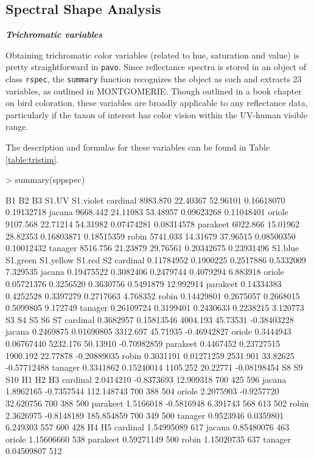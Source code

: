 \documentclass{article}
\newcommand{\pavo}{{\tt pavo}}  %
\newcommand{\code}[1]{{\tt #1}}  %
\begin{document}
\subsection{Spectral Shape Analysis}

\textit{\textbf{Trichromatic variables}}

Obtaining trichromatic color variables (related to hue, saturation and value) is pretty
straightforward in \pavo{}. Since reflectance spectra is stored in an object of class 
\code{rspec}, the \code{summary} function recognizes the object as such and extracts 23 
variables, as outlined in MONTGOMERIE. Though outlined in a book chapter on bird coloration, 
these variables are broadly applicable to any reflectance data, particularly if the taxon of 
interest has color vision within the UV-human visible range.

The description and formulas for these variables can be found in Table \ref{table:tristim}.

\begin{Schunk}
\begin{Sinput}
> summary(sppspec)
\end{Sinput}
\begin{Soutput}
               B1       B2       B3      S1.UV  S1.violet
cardinal 8983.870 22.40367 52.96101 0.16618070 0.19132718
jacana   9668.442 24.11083 53.48957 0.09623268 0.11048401
oriole   9107.568 22.71214 54.31982 0.07474281 0.08314578
parakeet 6022.866 15.01962 28.82353 0.16803871 0.18515359
robin    5741.033 14.31679 37.96515 0.08500350 0.10012432
tanager  8516.756 21.23879 29.76561 0.20342675 0.23931496
            S1.blue  S1.green S1.yellow    S1.red        S2
cardinal 0.11784952 0.1900225 0.2517886 0.5332009  7.329535
jacana   0.19475522 0.3082406 0.2479744 0.4079294  6.883918
oriole   0.05721376 0.3256520 0.3630756 0.5491879 12.992914
parakeet 0.14334383 0.4252528 0.3397279 0.2717663  4.768352
robin    0.14429801 0.2675057 0.2668015 0.5099805  9.172749
tanager  0.26109724 0.3199401 0.2430633 0.2238215  3.120773
                S3         S4       S5       S6          S7
cardinal 0.3682957 0.15813546 4004.193 45.73531 -0.38403228
jacana   0.2469875 0.01690805 3312.697 45.71935 -0.46942827
oriole   0.3444943 0.06767440 5232.176 50.13910 -0.70982859
parakeet 0.4467452 0.23727515 1900.192 22.77878 -0.20889035
robin    0.3031191 0.01271259 2531.901 33.82625 -0.57712488
tanager  0.3341862 0.15240014 1105.252 20.22771 -0.08198454
                S8         S9        S10  H1  H2  H3
cardinal 2.0414210 -0.8373693  12.909318 700 425 596
jacana   1.8962165 -0.7357544 112.148743 700 388 504
oriole   2.2075903 -0.9257720  32.620756 700 388 500
parakeet 1.5166018 -0.5816948   6.391743 568 613 502
robin    2.3626975 -0.8148189 185.854859 700 349 500
tanager  0.9523946  0.0359801   6.249303 557 600 428
                 H4  H5
cardinal 1.54995089 617
jacana   0.85480076 463
oriole   1.15606660 538
parakeet 0.59271149 500
robin    1.15020735 637
tanager  0.04509807 512
\end{Soutput}
\end{Schunk}
\end{document}
